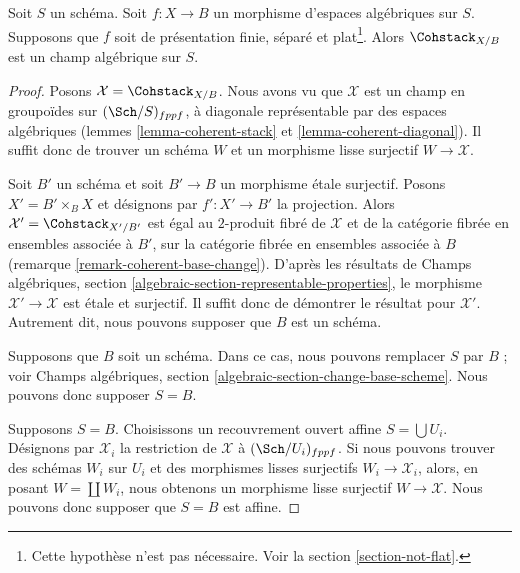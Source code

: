 \begin{theorem}
\label{theorem-coherent-algebraic}
Soit $S$ un schéma. Soit $f : X \to B$ un morphisme d'espaces algébriques sur
$S$. Supposons que $f$ soit de présentation finie, séparé et
plat\footnote{Cette hypothèse n'est pas nécessaire. Voir la section
\ref{section-not-flat}.}. Alors $\Cohstack_{X/B}$ est un champ algébrique sur
$S$.
\end{theorem}

\begin{proof}
Posons $\mathcal{X} = \Cohstack_{X/B}$. Nous avons vu que $\mathcal{X}$ est un
champ en groupoïdes sur $(\Sch/S)_{fppf}$, à diagonale représentable par des
espaces algébriques (lemmes \ref{lemma-coherent-stack} et
\ref{lemma-coherent-diagonal}). Il suffit donc de trouver un schéma $W$ et un
morphisme lisse surjectif $W \to \mathcal{X}$.

\medskip\noindent
Soit $B'$ un schéma et soit $B' \to B$ un morphisme \'etale surjectif. Posons
$X' = B' \times_B X$ et désignons par $f' : X' \to B'$ la projection. Alors
$\mathcal{X}' = \Cohstack_{X'/B'}$ est égal au $2$-produit fibré de
$\mathcal{X}$ et de la catégorie fibrée en ensembles associée à $B'$, sur la
catégorie fibrée en ensembles associée à $B$ (remarque
\ref{remark-coherent-base-change}). D'après les résultats de Champs
algébriques, section \ref{algebraic-section-representable-properties}, le
morphisme $\mathcal{X}' \to \mathcal{X}$ est \'etale et surjectif. Il suffit donc
de démontrer le résultat pour $\mathcal{X}'$. Autrement dit, nous pouvons
supposer que $B$ est un schéma.

\medskip\noindent
Supposons que $B$ soit un schéma. Dans ce cas, nous pouvons remplacer $S$ par
$B$ ; voir Champs algébriques, section
\ref{algebraic-section-change-base-scheme}. Nous pouvons donc supposer
$S = B$.

\medskip\noindent
Supposons $S = B$. Choisissons un recouvrement ouvert affine
$S = \bigcup U_i$. Désignons par $\mathcal{X}_i$ la restriction de
$\mathcal{X}$ à $(\Sch/U_i)_{fppf}$. Si nous pouvons trouver des schémas $W_i$
sur $U_i$ et des morphismes lisses surjectifs
$W_i \to \mathcal{X}_i$, alors, en posant $W = \coprod W_i$, nous obtenons un
morphisme lisse surjectif $W \to \mathcal{X}$. Nous pouvons donc supposer que
$S = B$ est affine.


\end{proof}
